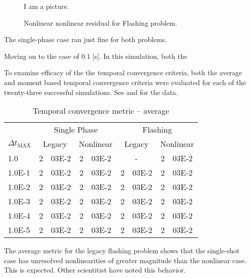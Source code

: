 \begin{figure}[h!t]
\begin{center}
I am a picture.
\end{center}
\caption{Nonlinear \cobra{} nonlinear residual for Flashing problem.}
\label{fig:nonlinear_flashing_residual}
\end{figure}

The single-phase case ran just fine for both problems.

Moving on to the case of 0.1 [s].
In this simulation, both the

To examine efficacy of the the temporal convergence criteria, both the average and moment based temporal convergence criteria were evaluated for each of the twenty-three successful simulations.
See  and  for the data.

\begin{table}[h!t]
\centering
\begin{tabular}{@{}l r@{.}l r@{.}l r@{.}l r@{.}l @{}}
\toprule
& \multicolumn{4}{c}{Single Phase} & \multicolumn{4}{c}{Flashing}  \\
$\Delta t_{\text{MAX}}$ & \multicolumn{2}{c}{Legacy} & \multicolumn{2}{c}{Nonlinear} & \multicolumn{2}{c}{Legacy}& \multicolumn{2}{c}{Nonlinear}  \\
\midrule
1.0    & 2&03E-2 & 2&03E-2 & \multicolumn{2}{c}{-} & 2&03E-2 \\
1.0E-1 & 2&03E-2 & 2&03E-2 & 2&03E-2 & 2&03E-2 \\
1.0E-2 & 2&03E-2 & 2&03E-2 & 2&03E-2 & 2&03E-2 \\
1.0E-3 & 2&03E-2 & 2&03E-2 & 2&03E-2 & 2&03E-2 \\
1.0E-4 & 2&03E-2 & 2&03E-2 & 2&03E-2 & 2&03E-2 \\
1.0E-5 & 2&03E-2 & 2&03E-2 & 2&03E-2 & 2&03E-2 \\
\bottomrule  
\end{tabular}
\caption{Temporal convergence metric -- average}
\label{tab:criteria_ave}
\end{table}

The average metric for the legacy flashing problem shows that the single-shot case has unresolved nonlinearities of greater magnitude than the nonlinear case.
This is expected.
Other scientitist have noted this behavior.


